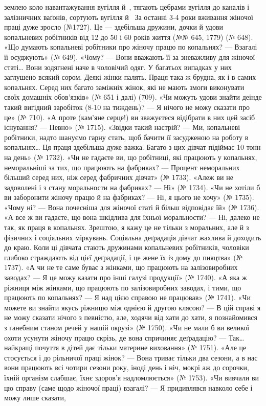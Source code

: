 \parcont{}  %
землею коло навантажування вугілля й~, тягають цебрами
вугілля до каналів і залізничних ваґонів, сортують вугілля й~ За останні 3-4 роки вживання жіночої праці дуже зросло
(№1727). Це — здебільша дружини, дочки й удови копальневих
робітників від 12 до 50 і 60 років життя (№№ 645, 1779) (№ 648).
«Що думають копальневі робітники про жіночу працю по копальнях?
— Взагалі її осуджують» (№ 649). «Чому? — Вони вважають
її за зневажливу для жіночої статі\dots{} Вони зодягнені наче в чоловічий
одяг. У багатьох випадках у них заглушено всякий сором.
Деякі жінки палять. Праця така ж брудна, як і в самих копальнях.
Серед них багато заміжніх жінок, які не мають змоги виконувати
своїх домашніх обов’язків» (№ 651 і далі) (709). «Чи
можуть удови знайти деінде такий вигідний заробіток (8-10 на тиждень)? — Я нічого не можу сказати про це»
(№ 710). «А проте (кам’яне серце!) ви зважуєтеся відібрати в
них цей засіб існування? — Певно» (№ 1715). «Звідки такий
настрій? — Ми, копальневі робітники, надто шануємо гарну
стать, щоб бачити її засудженою на роботу в копальнях\dots{} Ця
праця здебільша дуже важка. Багато з цих дівчат підіймає
10 тонн на день» (№ 1732). «Чи не гадаєте ви, що робітниці, які
працюють у копальнях, неморальніші за тих, що працюють на
фабриках? — Процент неморальних більший серед них, ніж серед
фабричних дівчат» (№ 1733). «Алеж ви не задоволені і з стану
моральности на фабриках? — Ні» (№ 1734). «Чи не хотіли б ви
заборонити жіночу працю й на фабриках? — Ні, я цього не хочу»
(№ 1735). «Чому ні? — Вона почесніша для жіночої статі й більш
відповідає їй» (№ 1736). «А все ж ви гадаєте, що вона шкідлива
для їхньої моральности? — Ні, далеко не так, як праця в копальнях.
Зрештою, я кажу це не тільки з моральних, але й з фізичних
і соціяльних міркувань. Соціяльна деґрадація дівчат жахлива
й доходить до краю. Коли ці дівчата стають дружинами копальневих
робітників, чоловіки глибоко страждають від цієї деґрадації,
і це жене їх із дому до пияцтва» (№ 1737). «А чи не те саме буває
з жінками, що працюють на залізовиробних заводах? — Я це
можу казати про інші галузі продукції» (№ 1740). «А яка ж ріжниця
між жінками, що працюють по залізовиробних заводах,
і тими, що працюють по копальнях? — Я над цією справою не
працював» (№ 1741). «Чи можете ви знайти якусь ріжницю
між однією й другою клясою? — В цій справі я не можу сказати
нічого з певністю, але, ходячи від хати до хати, я познайомився
з ганебним станом речей у нашій окрузі» (№ 1750). «Чи не мали б
ви великої охоти усунути жіночу працю скрізь, де вона спричиняє
деґрадацію? — Так\dots{} найкращі почуття в дітей дає тільки материне
виховання» (№ 1751). «Але це стосується і до рільничої
праці жінок? — Вона триває тільки два сезони, а в нас вони працюють
всі чотири сезони року, іноді день і ніч, мокрі аж до
сорочки, їхній організм слабшає, їхнє здоров’я надломлюється»
(№ 1753). «Чи вивчали ви цю справу (саме щодо жіночої праці)
взагалі? — Я придивлявся навколо себе і можу лише сказати,
\parbreak{}  %
